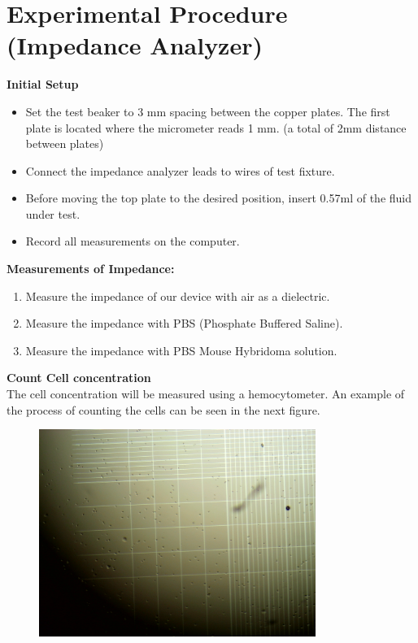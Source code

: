 \documentclass[journal]{IEEEtran}
\begin{document}
\section{Experimental Procedure (Impedance Analyzer)}

\textbf{Initial Setup}
\begin{itemize}
	\item Set the test beaker to 3 mm spacing between the copper plates. The first plate is located where the micrometer reads 1 mm. (a total of 2mm distance between plates)
	\item Connect the impedance analyzer leads to wires of test fixture.
	\item Before moving the top plate to the desired position, insert 0.57ml of the fluid under test.
	\item Record all measurements on the computer.
\end{itemize}

\textbf{Measurements of Impedance:}
\begin{enumerate}
	\item Measure the impedance of our device with air as a dielectric.
	\item Measure the impedance with PBS (Phosphate Buffered Saline).
	\item Measure the impedance with PBS Mouse Hybridoma solution.
\end{enumerate}

\textbf{Count Cell concentration} \\
The cell concentration will be measured using a hemocytometer. An example of the process of counting the cells can be seen in the next figure.

\begin{figure}[h]
\label{hemocytometer}
\includegraphics[width=9cm]{hemocytometer.jpg}
\end{figure}
\end{document}

